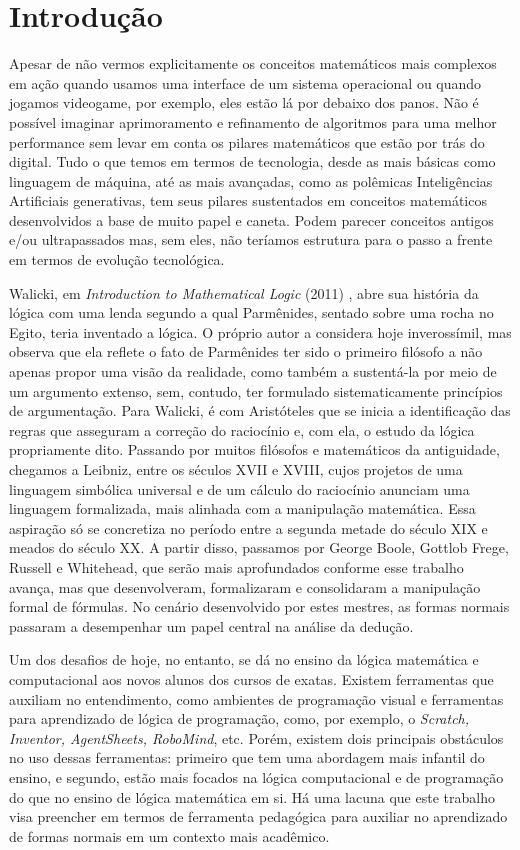 \documentclass[12pt,a4paper,oneside]{report}
\theoremstyle{tituloplain}
\theoremstyle{titulodef}
\begin{document}
\chapter*{Introdução}
Apesar de não vermos explicitamente os conceitos matemáticos mais complexos em ação quando usamos uma interface de um sistema operacional ou quando jogamos videogame, por exemplo, eles estão lá por debaixo dos panos. Não é possível imaginar aprimoramento e refinamento de algoritmos para uma melhor performance sem levar em conta os pilares matemáticos que estão por trás do digital. Tudo o que temos em termos de tecnologia, desde as mais básicas como linguagem de máquina, até as mais avançadas, como as polêmicas Inteligências Artificiais generativas, tem seus pilares sustentados em conceitos matemáticos desenvolvidos a base de muito papel e caneta. Podem parecer conceitos antigos e/ou ultrapassados mas, sem eles, não teríamos estrutura para o passo a frente em termos de evolução tecnológica.

Walicki, em \textit{Introduction to Mathematical Logic} (2011) \cite{walicki2011}, abre sua história da lógica com uma lenda segundo a qual Parmênides, sentado sobre uma rocha no Egito, teria inventado a lógica. O próprio autor a considera hoje inverossímil, mas observa que ela reflete o fato de Parmênides ter sido o primeiro filósofo a não apenas propor uma visão da realidade, como também a sustentá-la por meio de um argumento extenso, sem, contudo, ter formulado sistematicamente princípios de argumentação. Para Walicki, é com Aristóteles que se inicia a identificação das regras que asseguram a correção do raciocínio e, com ela, o estudo da lógica propriamente dito. Passando por muitos filósofos e matemáticos da antiguidade, chegamos a Leibniz, entre os séculos XVII e XVIII, cujos projetos de uma linguagem simbólica universal e de um cálculo do raciocínio anunciam uma linguagem formalizada, mais alinhada com a manipulação matemática. Essa aspiração só se concretiza no período entre a segunda metade do século XIX e meados do século XX. A partir disso, passamos por George Boole, Gottlob Frege, Russell e Whitehead, que serão mais aprofundados conforme esse trabalho avança, mas que desenvolveram, formalizaram e consolidaram a manipulação formal de fórmulas. No cenário desenvolvido por estes mestres, as formas normais passaram a desempenhar um papel central na análise da dedução.

Um dos desafios de hoje, no entanto, se dá no ensino da lógica matemática e computacional aos novos alunos dos cursos de exatas. Existem ferramentas que auxiliam no entendimento, como ambientes de programação visual e ferramentas para aprendizado de lógica de programação, como, por exemplo, o \textit{Scratch, Inventor, AgentSheets, RoboMind}, etc. \cite{gilson2017} \cite{ketrin2022} Porém, existem dois principais obstáculos no uso dessas ferramentas: primeiro que tem uma abordagem mais infantil do ensino, e segundo, estão mais focados na lógica computacional e de programação do que no ensino de lógica matemática em si. Há uma lacuna que este trabalho visa preencher em termos de ferramenta pedagógica para auxiliar no aprendizado de formas normais em um contexto mais acadêmico.
\end{document}
